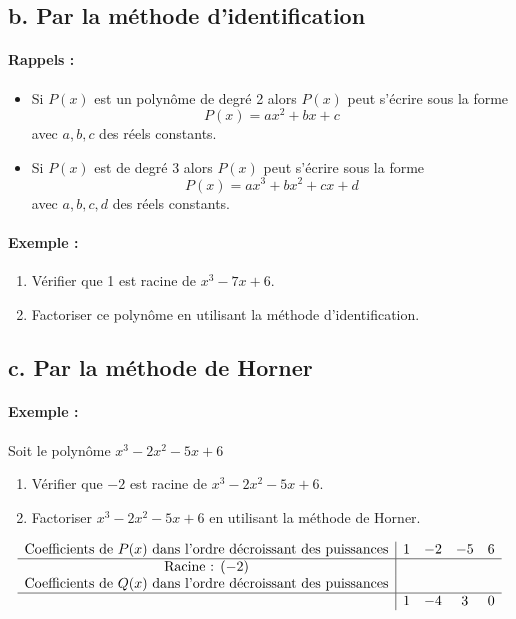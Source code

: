 \documentclass[12pt,a4paper]{article}
\begin{document}
\subsection*{b. Par la méthode d'identification}

\paragraph{Rappels :}
\begin{itemize}
    \item Si \( P(x) \) est un polynôme de degré 2 alors \( P(x) \) peut s'écrire sous la forme 
    \[
    P(x) = ax^2 + bx + c
    \]
    avec \( a, b, c \) des réels constants.
    \item Si \( P(x) \) est de degré 3 alors \( P(x) \) peut s'écrire sous la forme 
    \[
    P(x) = ax^3 + bx^2 + cx + d
    \]
    avec \( a, b, c, d \) des réels constants.
\end{itemize}

\paragraph{Exemple :}
\begin{enumerate}
    \item Vérifier que 1 est racine de \( x^3 - 7x + 6 \).
    \item Factoriser ce polynôme en utilisant la méthode d'identification.
\end{enumerate}

\subsection*{c. Par la méthode de Horner}

\paragraph{Exemple :} Soit le polynôme \( x^3 - 2x^2 - 5x + 6 \)
\begin{enumerate}
    \item Vérifier que \(-2\) est racine de \( x^3 - 2x^2 - 5x + 6 \).
    \item Factoriser \( x^3 - 2x^2 - 5x + 6 \) en utilisant la méthode de Horner.
\end{enumerate}

\[
\begin{array}{c|cccc}
\text{Coefficients de } P(x) \text{ dans l'ordre décroissant des puissances} & 1 & -2 & -5 & 6 \\
\hline
\text{Racine : } (-2) & & & & \\
\text{Coefficients de } Q(x) \text{ dans l'ordre décroissant des puissances} & & & & \\
\hline
 & 1 & -4 & 3 & 0
\end{array}
\]
\end{document}
